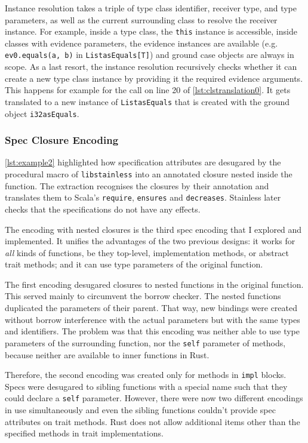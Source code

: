 Instance resolution takes a triple of type class identifier, receiver type, and
type parameters, as well as the current surrounding class to resolve the
receiver instance. For example, inside a type class, the \lstinline!this!
instance is accessible, inside classes with evidence parameters, the evidence
instances are available (e.g. \lstinline!ev0.equals(a, b)! in
\lstinline!ListasEquals[T]!) and ground case objects are always in scope. As a
last resort, the instance resolution recursively checks whether it can create a
new type class instance by providing it the required evidence arguments. This
happens for example for the call on line 20 of \autoref{lst:clstranslation0}. It
gets translated to a new instance of \lstinline!ListasEquals! that is created
with the ground object \lstinline!i32asEquals!.



\subsubsection{Spec Closure Encoding}
\label{spec-encoding}

\autoref{lst:example2} highlighted how specification attributes are desugared by
the procedural macro of \lstinline!libstainless! into an annotated closure
nested inside the function. The extraction recognises the closures by their
annotation and translates them to Scala's \lstinline!require!,
\passthrough{\lstinline!ensures!} and \passthrough{\lstinline!decreases!}.
Stainless later checks that the specifications do not have any effects.

The encoding with nested closures is the third spec encoding that I explored and
implemented. It unifies the advantages of the two previous designs: it works for
\emph{all} kinds of functions, be they top-level, implementation methods, or
abstract trait methods; and it can use type parameters of the original function.

The first encoding desugared closures to nested functions in the original
function. This served mainly to circumvent the borrow checker. The nested
functions duplicated the parameters of their parent. That way, new bindings were
created without borrow interference with the actual parameters but with the same
types and identifiers. The problem was that this encoding was neither able to
use type parameters of the surrounding function, nor the \lstinline!self!
parameter of methods, because neither are available to inner functions in Rust.

Therefore, the second encoding was created only for methods in \lstinline!impl!
blocks. Specs were desugared to sibling functions with a special name such that
they could declare a \lstinline!self! parameter. However, there were now two
different encodings in use simultaneously and even the sibling functions
couldn't provide spec attributes on trait methods. Rust does not allow
additional items other than the specified methods in trait implementations.

